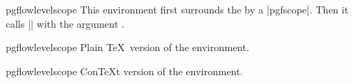 \begin{environment}{{pgflowlevelscope}}
  This environment first surrounds the  by
  a |{pgfscope}|. Then it calls |\pgflowlevel| with the argument
  .

\begin{codeexample}[]
\end{codeexample}
\end{environment}


\begin{plainenvironment}{{pgflowlevelscope}}
  Plain \TeX\ version of the environment.
\end{plainenvironment}

\begin{contextenvironment}{{pgflowlevelscope}}
  Con\TeX t version of the environment.
\end{contextenvironment}




